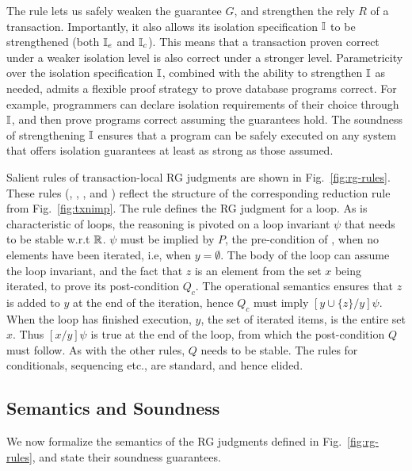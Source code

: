 The  rule lets us safely weaken the guarantee
$G$, and strengthen the rely $R$ of a transaction. Importantly, it
also allows its isolation specification $\mathbb{I}$ to be strengthened (both
$\mathbb{I}_e$ and $\mathbb{I}_c$). This means that a transaction proven correct under
a weaker isolation level is also correct under a stronger level.
Parametricity over the isolation specification $\mathbb{I}$, combined with the
ability to strengthen $\mathbb{I}$ as needed, admits a flexible proof strategy
to prove database programs correct. For example, programmers can
declare isolation requirements of their choice through $\mathbb{I}$, and then
prove programs correct assuming the guarantees hold. The soundness of
strengthening $\mathbb{I}$ ensures that a program can be safely executed on
any system that offers isolation guarantees at least as strong as
those assumed.

Salient rules of transaction-local RG judgments are shown in
Fig.~\ref{fig:rg-rules}. These rules (,
, , and
) reflect the structure of the corresponding
reduction rule from Fig.~\ref{fig:txnimp}.  The rule
 defines the RG judgment for a  loop.
As is characteristic of loops, the reasoning is pivoted on a loop
invariant $\psi$ that needs to be stable w.r.t $\mathbb{R}$. $\psi$ must be
implied by $P$, the pre-condition of , when no elements
have been iterated, i.e, when $y=\emptyset$. The body of the loop can
assume the loop invariant, and the fact that $z$ is an element from
the set $x$ being iterated, to prove its post-condition $Q_c$. The
operational semantics ensures that $z$ is added to $y$ at the end of
the iteration, hence $Q_c$ must imply $[y\cup\{z\}/y]\psi$. When the
loop has finished execution, $y$, the set of iterated items, is the
entire set $x$. Thus $[x/y]\psi$ is true at the end of the loop, from
which the post-condition $Q$ must follow. As with the other rules, $Q$
needs to be stable. The rules for conditionals, sequencing etc., are
standard, and hence elided.

\subsection{Semantics and Soundness}

We now formalize the semantics of the RG judgments defined in
Fig.~\ref{fig:rg-rules}, and state their soundness guarantees.

